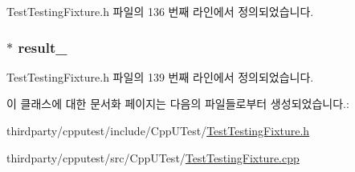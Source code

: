 Test\+Testing\+Fixture.\+h 파일의 136 번째 라인에서 정의되었습니다.

\subsubsection[{\texorpdfstring{result\+\_\+}{result_}}]{$\ast$ result\+\_\+}\hypertarget{class_test_testing_fixture_acf81b99797e96c7d602ffc4c3cb012b0}{}\label{class_test_testing_fixture_acf81b99797e96c7d602ffc4c3cb012b0}


Test\+Testing\+Fixture.\+h 파일의 139 번째 라인에서 정의되었습니다.



이 클래스에 대한 문서화 페이지는 다음의 파일들로부터 생성되었습니다.\+:\begin{DoxyCompactItemize}
\item 
thirdparty/cpputest/include/\+Cpp\+U\+Test/\hyperlink{_test_testing_fixture_8h}{Test\+Testing\+Fixture.\+h}\item 
thirdparty/cpputest/src/\+Cpp\+U\+Test/\hyperlink{_test_testing_fixture_8cpp}{Test\+Testing\+Fixture.\+cpp}\end{DoxyCompactItemize}
